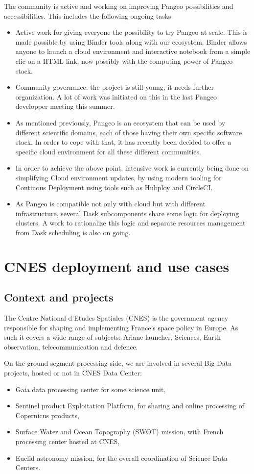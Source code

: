 \documentclass{article}
\begin{document}
The community is active and working on improving Pangeo possibilities and accessibilities. This includes the following ongoing tasks:\begin{itemize}
\item Active work for giving everyone the possibility to try Pangeo at scale. This is made possible by using Binder tools along with our ecosystem\cite{b8}. Binder allows anyone to launch a cloud environment and interactive notebook from a simple clic on a HTML link, now possibly with the computing power of Pangeo stack.
\item Community governance: the project is still young, it needs further organization. A lot of work was initiated on this in the last Pangeo developper meeting this summer.
\item As mentioned previously, Pangeo is an ecosystem that can be used by different scientific domains, each of those having their own specific software stack. In order to cope with that, it has recently been decided to offer a specific cloud environment for all these different communities.
\item In order to achieve the above point, intensive work is currently being done on simplifying Cloud environment updates, by using modern tooling for Continous Deployment using tools such as Hubploy and CircleCI.
\item As Pangeo is compatible not only with cloud but with different infrastructure, several Dask subcomponents share some logic for deploying clusters. A work to rationalize this logic and separate resources management from Dask scheduling is also on going.
\end{itemize}

\section{CNES deployment and use cases}
\label{sec:cnes}

\subsection{Context and projects}
\label{ssec:context}

The Centre National d'Etudes Spatiales (CNES) is the government agency responsible for shaping and implementing France's space policy in Europe. As such it covers a wide range of subjects: Ariane launcher, Sciences, Earth observation, telecommunication and defence.

On the ground segment processing side, we are involved in several Big Data projects, hosted or not in CNES Data Center:
\begin{itemize}
\item Gaia data processing center for some science unit,
\item Sentinel product Exploitation Platform, for sharing and online processing of Copernicus products,
\item Surface Water and Ocean Topography (SWOT) mission, with French processing center hosted at CNES,
\item Euclid astronomy mission, for the overall coordination of Science Data Centers.
\end{itemize}
\end{document}
